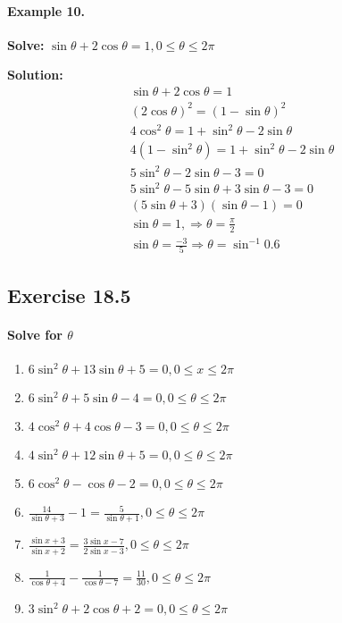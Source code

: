 \documentclass{article}
\begin{document}
\paragraph{Example 10.}
\textbf{Solve:} $\sin\theta + 2\cos\theta = 1, 0 \leq \theta \leq 2\pi$

{\scriptsize \textbf{Solution:}}
\[
  \begin{aligned}
    \sin\theta + 2\cos\theta = 1 \\
    (2\cos\theta)^{2} = (1 -\sin\theta)^{2} \\
    4\cos^{2}\theta = 1 +\sin^{2}\theta - 2\sin\theta \\
    4(1-\sin^{2}\theta) = 1 +\sin^{2}\theta - 2\sin\theta \\
    5\sin^{2}\theta - 2\sin\theta - 3 = 0 \\
    5\sin^{2}\theta - 5\sin\theta + 3\sin\theta - 3 = 0 \\
    (5\sin\theta+3)(\sin\theta-1)= 0 \\
    \sin\theta = 1, \Rightarrow \theta = \frac{\pi}{2} \\
    \sin\theta = \frac{-3}{5} \Rightarrow \theta = \sin^{-1}0.6
  \end{aligned}
\]

\subsection {Exercise 18.5}
\paragraph{Solve for $\theta$}

\begin{enumerate}[label=Q\arabic*)]
  \item $6\sin^{2}\theta + 13\sin\theta + 5 = 0, 0 \leq x \leq 2\pi$
  \item $6\sin^{2}\theta + 5\sin\theta - 4 = 0, 0 \leq \theta \leq 2\pi$
  \item $4\cos^{2}\theta + 4\cos\theta - 3 = 0, 0 \leq \theta \leq 2\pi$
  \item $4\sin^{2}\theta + 12\sin\theta + 5 = 0, 0 \leq \theta \leq 2\pi$
  \item $6\cos^{2}\theta - \cos\theta - 2 = 0, 0 \leq \theta \leq 2\pi$
  \item $\frac{14}{\sin\theta+3} - 1 = \frac{5}{\sin\theta+1}, 0 \leq \theta \leq 2\pi$
  \item $\frac{\sin x+3}{\sin x+2} = \frac{3\sin x-7}{2\sin x-3}, 0 \leq \theta \leq 2\pi$
  \item $\frac{1}{\cos\theta+4} - \frac{1}{\cos\theta-7} = \frac{11}{30}, 0 \leq \theta \leq 2\pi$
  \item $3\sin^{2}\theta + 2\cos\theta + 2 = 0, 0 \leq \theta \leq 2\pi$
\end{enumerate}
\end{document}
